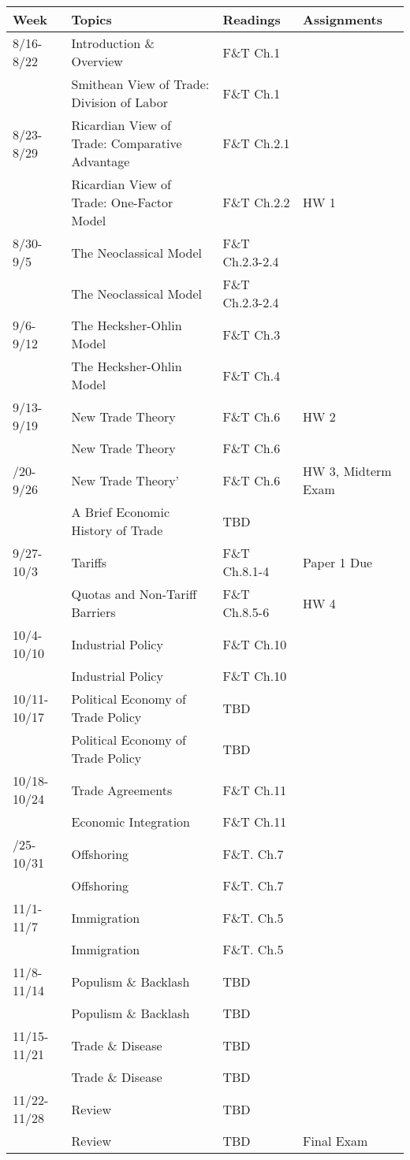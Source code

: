 \documentclass{article}
\begin{document}
\begin{center}
\begin{tabular}{llll}
\toprule
Week & Topics & Readings & Assignments\\
\midrule
8/16-8/22 & Introduction \& Overview & F\&T Ch.1 & \\
 & Smithean View of Trade: Division of Labor & F\&T Ch.1 & \\
8/23-8/29 & Ricardian View of Trade: Comparative Advantage & F\&T Ch.2.1 & \\
 & Ricardian View of Trade: One-Factor Model & F\&T Ch.2.2 & HW 1\\
8/30-9/5 & The Neoclassical Model & F\&T Ch.2.3-2.4 & \\
\addlinespace
 & The Neoclassical Model & F\&T Ch.2.3-2.4 & \\
9/6-9/12 & The Hecksher-Ohlin Model & F\&T Ch.3 & \\
 & The Hecksher-Ohlin Model & F\&T Ch.4 & \\
9/13-9/19 & New Trade Theory & F\&T Ch.6 & HW 2\\
 & New Trade Theory & F\&T Ch.6 & \\
\addlinespace
9/20-9/26 & New Trade Theory' & F\&T Ch.6 & HW 3, Midterm Exam\\
 & A Brief Economic History of Trade & TBD & \\
9/27-10/3 & Tariffs & F\&T Ch.8.1-4 & Paper 1 Due\\
 & Quotas and Non-Tariff Barriers & F\&T Ch.8.5-6 & HW 4\\
10/4-10/10 & Industrial Policy & F\&T Ch.10 & \\
\addlinespace
 & Industrial Policy & F\&T Ch.10 & \\
10/11-10/17 & Political Economy of Trade Policy & TBD & \\
 & Political Economy of Trade Policy & TBD & \\
10/18-10/24 & Trade Agreements & F\&T Ch.11 & \\
 & Economic Integration & F\&T Ch.11 & \\
\addlinespace
10/25-10/31 & Offshoring & F\&T. Ch.7 & \\
 & Offshoring & F\&T. Ch.7 & \\
11/1-11/7 & Immigration & F\&T. Ch.5 & \\
 & Immigration & F\&T. Ch.5 & \\
11/8-11/14 & Populism \& Backlash & TBD & \\
\addlinespace
 & Populism \& Backlash & TBD & \\
11/15-11/21 & Trade \& Disease & TBD & \\
 & Trade \& Disease & TBD & \\
11/22-11/28 & Review & TBD & \\
 & Review & TBD & Final Exam\\
\bottomrule
\end{tabular}
\end{center}
\end{document}

